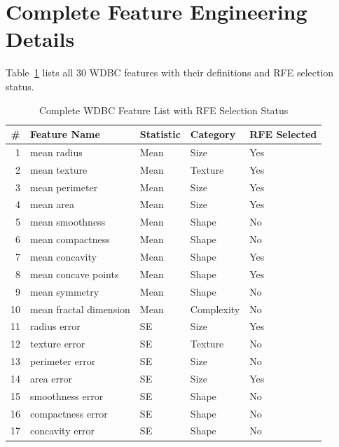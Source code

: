 \documentclass[10pt,letterpaper]{article}
\begin{document}
\appendix

\section{Complete Feature Engineering Details}

Table~\ref{tab:all_features} lists all 30 WDBC features with their definitions and RFE
selection status.

\begin{table}[h]
\centering
\caption{Complete WDBC Feature List with RFE Selection Status}
\label{tab:all_features}
\begin{tabular}{rllll}
\toprule
\textbf{\#} & \textbf{Feature Name} & \textbf{Statistic} & \textbf{Category} & \textbf{RFE Selected} \\
\midrule
1  & mean radius             & Mean & Size      & Yes \\
2  & mean texture            & Mean & Texture   & Yes \\
3  & mean perimeter          & Mean & Size      & Yes \\
4  & mean area               & Mean & Size      & Yes \\
5  & mean smoothness         & Mean & Shape     & No  \\
6  & mean compactness        & Mean & Shape     & No  \\
7  & mean concavity          & Mean & Shape     & Yes \\
8  & mean concave points     & Mean & Shape     & Yes \\
9  & mean symmetry           & Mean & Shape     & No  \\
10 & mean fractal dimension  & Mean & Complexity & No \\
11 & radius error            & SE   & Size      & Yes \\
12 & texture error           & SE   & Texture   & No  \\
13 & perimeter error         & SE   & Size      & No  \\
14 & area error              & SE   & Size      & Yes \\
15 & smoothness error        & SE   & Shape     & No  \\
16 & compactness error       & SE   & Shape     & No  \\
17 & concavity error         & SE   & Shape     & No  \\

\end{tabular}
\end{table}
\end{document}

